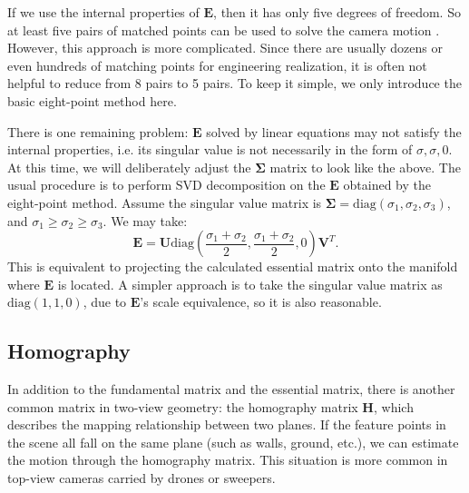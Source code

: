 If we use the internal properties of $\mathbf{E}$, then it has only five degrees of freedom. So at least five pairs of matched points can be used to solve the camera motion {\cite{Li2006, Nister2004a}}. However, this approach is more complicated. Since there are usually dozens or even hundreds of matching points for engineering realization, it is often not helpful to reduce from 8 pairs to 5 pairs. To keep it simple, we only introduce the basic eight-point method here.

There is one remaining problem: $\mathbf{E}$ solved by linear equations may not satisfy the internal properties, i.e. its singular value is not necessarily in the form of ${\sigma}, {\sigma}, 0$. At this time, we will deliberately adjust the $\boldsymbol{\Sigma}$ matrix to look like the above. The usual procedure is to perform SVD decomposition on the $\mathbf{E}$ obtained by the eight-point method. Assume the singular value matrix is $\boldsymbol{\Sigma} = \mathrm{diag} (\sigma_1, \sigma_2, \sigma_3)$, and $\sigma_1 \geqslant \sigma_2 \geqslant \sigma_3$. We may take:
\begin{equation}
\mathbf{E} = \mathbf{U} \mathrm{diag} (\frac{\sigma_1+\sigma_2}{2}, \frac{\sigma_1+\sigma_2}{2}, 0) \mathbf{V}^T.
\end{equation}
This is equivalent to projecting the calculated essential matrix onto the manifold where $\mathbf{E}$ is located. A simpler approach is to take the singular value matrix as $\mathrm{diag} (1,1,0)$, due to $\mathbf{E}$'s scale equivalence, so it is also reasonable.

\subsection{Homography}
In addition to the fundamental matrix and the essential matrix, there is another common matrix in two-view geometry: the homography matrix $\mathbf{H}$, which describes the mapping relationship between two planes. If the feature points in the scene all fall on the same plane (such as walls, ground, etc.), we can estimate the motion through the homography matrix. This situation is more common in top-view cameras carried by drones or sweepers. 


